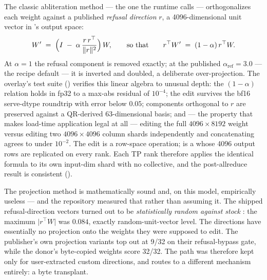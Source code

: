 The classic abliteration method --- the one the runtime calls  ---
orthogonalizes each weight against a published \emph{refusal direction} $r$,
a 4096-dimensional unit vector in 's output space:
%
\[
W' \;=\; \Bigl(I \;-\; \alpha\,\frac{r\,r^{\top}}{\lVert r\rVert^{2}}\Bigr)\,W,
\qquad\text{so that}\qquad
r^{\top} W' \;=\; (1-\alpha)\,r^{\top} W .
\]
%
At $\alpha=1$ the refusal component is removed exactly; at the published
$\alpha_{\mathrm{ref}}=3.0$ --- the recipe default 
--- it is inverted and doubled, a deliberate over-projection. The overlay's
test suite () verifies this linear algebra to
unusual depth: the $(1-\alpha)$ relation holds in fp32 to a max-abs residual
of $10^{-4}$; the edit survives the bf16 serve-dtype roundtrip with error
below $0.05$; components orthogonal to $r$ are preserved against a QR-derived
63-dimensional basis; and --- the property that makes load-time application
legal at all --- editing the full $4096 \times 8192$ weight versus editing
two $4096 \times 4096$ column shards independently and concatenating agrees
to under $10^{-2}$. The edit is a row-space operation;  is a
 whose 4096 output rows are replicated on every
rank. Each TP rank therefore applies the identical formula to its own
input-dim shard with no collective, and the post-allreduce result is
consistent ().

\begin{hbwarstory}
The projection method is mathematically sound and, on this model,
empirically useless --- and the repository measured that rather than assuming it.
The shipped refusal-direction vectors turned out to be \emph{statistically
random against stock }: the maximum $\lvert r^{\top}W\rvert$
was $0.084$, exactly random-unit-vector level. The directions have
essentially no projection onto the weights they were supposed to edit. The
publisher's own projection variants top out at 9/32 on their refusal-bypass
gate, while the donor's byte-copied weights score 32/32. The 
path was therefore kept only for user-extracted custom directions, and
 routes to a different mechanism entirely: a
byte transplant.
\end{hbwarstory}


